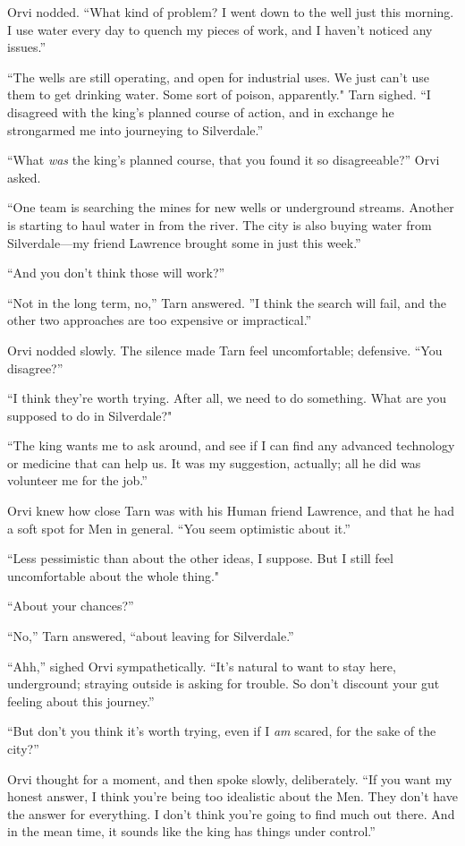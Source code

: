 Orvi nodded.  ``What kind of problem? I went down to the well just this morning.  I use water every day to quench my pieces of work, and I haven't noticed any issues.''

``The wells are still operating, and open for industrial uses.  We just can't use them to get drinking water.  Some sort of poison, apparently."  Tarn sighed.  ``I disagreed with the king's planned course of action, and in exchange he strongarmed me into journeying to Silverdale.''

``What \emph{was} the king's planned course, that you found it so disagreeable?'' Orvi asked.

``One team is searching the mines for new wells or underground streams.  Another is starting to haul water in from the river.  The city is also buying water from Silverdale---my friend Lawrence brought some in just this week.''

``And you don't think those will work?''

``Not in the long term, no,'' Tarn answered.  ''I think the search will fail, and the other two approaches are too expensive or impractical.''

Orvi nodded slowly.  The silence made Tarn feel uncomfortable; defensive.  ``You disagree?''

``I think they're worth trying.  After all, we need to do something.  What are you supposed to do in Silverdale?"

``The king wants me to ask around, and see if I can find any advanced technology or medicine that can help us.  It was my suggestion, actually; all he did was volunteer me for the job.''

Orvi knew how close Tarn was with his Human friend Lawrence, and that he had a soft spot for Men in general.  ``You seem optimistic about it.''

``Less pessimistic than about the other ideas, I suppose.  But I still feel uncomfortable about the whole thing."

``About your chances?''

``No,'' Tarn answered, ``about leaving for Silverdale.''

``Ahh,'' sighed Orvi sympathetically.  ``It's natural to want to stay here, underground; straying outside is asking for trouble.  So don't discount your gut feeling about this journey.''

``But don't you think it's worth trying, even if I \emph{am} scared, for the sake of the city?''

Orvi thought for a moment, and then spoke slowly, deliberately.  ``If you want my honest answer, I think you're being too idealistic about the Men.  They don't have the answer for everything.  I don't think you're going to find much out there.  And in the mean time, it sounds like the king has things under control.''


